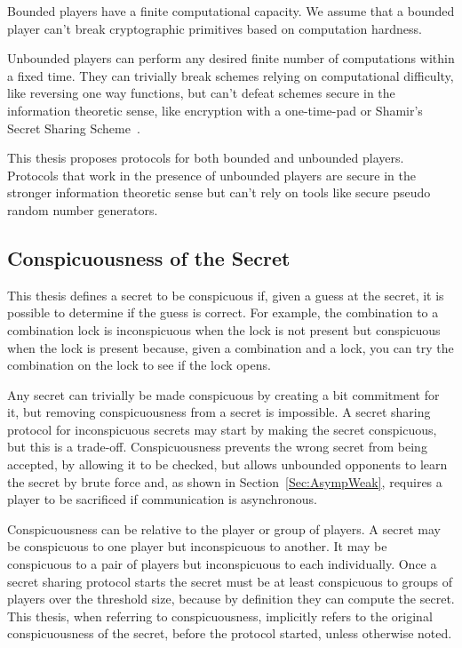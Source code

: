 \documentclass[12pt]{dalcsthesis}
\begin{document}
Bounded players have a finite computational capacity. We assume that a bounded player can't break cryptographic primitives based on computation hardness.

Unbounded players can perform any desired finite number of computations within a fixed time. They can trivially break schemes relying on computational difficulty, like reversing one way functions, but can't defeat schemes secure in the information theoretic sense, like encryption with a one-time-pad or Shamir's Secret Sharing Scheme~\cite{shamir79}.

This thesis proposes protocols for both bounded and unbounded players. Protocols that work in the presence of unbounded players are secure in the stronger information theoretic sense but can't rely on tools like secure pseudo random number generators.

\subsection{Conspicuousness of the Secret} 

This thesis defines a secret to be conspicuous if, given a guess at the secret, it is possible to determine if the guess is correct. For example, the combination to a combination lock is inconspicuous when the lock is not present but conspicuous when the lock is present because, given a combination and a lock, you can try the combination on the lock to see if the lock opens.

Any secret can trivially be made conspicuous by creating a bit commitment for it, but removing conspicuousness from a secret is impossible. A secret sharing protocol for inconspicuous secrets may start by making the secret conspicuous, but this is a trade-off. Conspicuousness prevents the wrong secret from being accepted, by allowing it to be checked, but allows unbounded opponents to learn the secret by brute force and, as shown in Section~\ref{Sec:AsympWeak}, requires a player to be sacrificed if communication is asynchronous.

Conspicuousness can be relative to the player or group of players. A secret may be conspicuous to one player but inconspicuous to another. It may be conspicuous to a pair of players but inconspicuous to each individually. Once a secret sharing protocol starts the secret must be at least conspicuous to groups of players over the threshold size, because by definition they can compute the secret. This thesis, when referring to conspicuousness, implicitly refers to the original conspicuousness of the secret, before the protocol started, unless otherwise noted.
\end{document}
